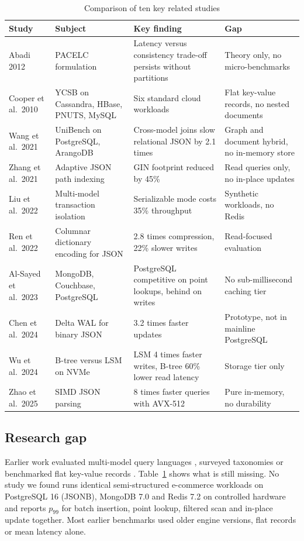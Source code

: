 \documentclass[conference,a4paper]{IEEEtran}
\begin{document}
\begin{table}[t]
\caption{Comparison of ten key related studies}
\label{tab:lit}
\centering
\footnotesize
\begin{tabularx}{\textwidth}{@{}p{2.5cm}p{2.9cm}p{4.4cm}X@{}}
\toprule
Study & Subject & Key finding & Gap \\
\midrule
Abadi 2012 \cite{abadi2012} & PACELC formulation & Latency versus consistency trade-off persists without partitions & Theory only, no micro-benchmarks \\
Cooper et al.\ 2010 \cite{cooper2010} & YCSB on Cassandra, HBase, PNUTS, MySQL & Six standard cloud workloads & Flat key-value records, no nested documents \\
Wang et al.\ 2021 \cite{wang2021} & UniBench on PostgreSQL, ArangoDB & Cross-model joins slow relational JSON by 2.1 times & Graph and document hybrid, no in-memory store \\
Zhang et al.\ 2021 \cite{zhang2021} & Adaptive JSON path indexing & GIN footprint reduced by 45\% & Read queries only, no in-place updates \\
Liu et al.\ 2022 \cite{liu2022} & Multi-model transaction isolation & Serializable mode costs 35\% throughput & Synthetic workloads, no Redis \\
Ren et al.\ 2022 \cite{ren2022} & Columnar dictionary encoding for JSON & 2.8 times compression, 22\% slower writes & Read-focused evaluation \\
Al-Sayed et al.\ 2023 \cite{alsayed2023} & MongoDB, Couchbase, PostgreSQL & PostgreSQL competitive on point lookups, behind on writes & No sub-millisecond caching tier \\
Chen et al.\ 2024 \cite{chen2024} & Delta WAL for binary JSON & 3.2 times faster updates & Prototype, not in mainline PostgreSQL \\
Wu et al.\ 2024 \cite{wu2024} & B-tree versus LSM on NVMe & LSM 4 times faster writes, B-tree 60\% lower read latency & Storage tier only \\
Zhao et al.\ 2025 \cite{zhao2025} & SIMD JSON parsing & 8 times faster queries with AVX-512 & Pure in-memory, no durability \\
\bottomrule
\end{tabularx}
\end{table}

\subsection{Research gap}
Earlier work evaluated multi-model query languages \cite{ong2014}, surveyed taxonomies \cite{lu2019,martinez2026} or benchmarked flat key-value records \cite{cooper2010}. Table~\ref{tab:lit} shows what is still missing. No study we found runs identical semi-structured e-commerce workloads on PostgreSQL 16 (JSONB), MongoDB 7.0 and Redis 7.2 on controlled hardware and reports $p_{99}$ for batch insertion, point lookup, filtered scan and in-place update together. Most earlier benchmarks used older engine versions, flat records or mean latency alone.
\end{document}
